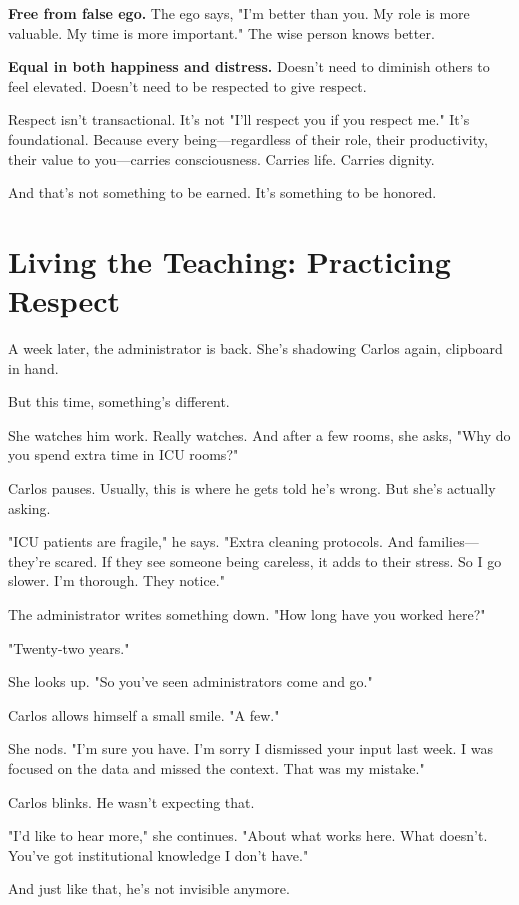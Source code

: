 \documentclass[11pt,twoside]{book}
\begin{document}
\textbf{\textbf{Free from false ego.}} The ego says, "I'm better than you. My role is more valuable. My time is more important." The wise person knows better.

\textbf{\textbf{Equal in both happiness and distress.}} Doesn't need to diminish others to feel elevated. Doesn't need to be respected to give respect.

Respect isn't transactional. It's not "I'll respect you if you respect me." It's foundational. Because every being—regardless of their role, their productivity, their value to you—carries consciousness. Carries life. Carries dignity.

And that's not something to be earned. It's something to be honored.

\section*{Living the Teaching: Practicing Respect}

A week later, the administrator is back. She's shadowing Carlos again, clipboard in hand.

But this time, something's different.

She watches him work. Really watches. And after a few rooms, she asks, "Why do you spend extra time in ICU rooms?"

Carlos pauses. Usually, this is where he gets told he's wrong. But she's actually asking.

"ICU patients are fragile," he says. "Extra cleaning protocols. And families—they're scared. If they see someone being careless, it adds to their stress. So I go slower. I'm thorough. They notice."

The administrator writes something down. "How long have you worked here?"

"Twenty-two years."

She looks up. "So you've seen administrators come and go."

Carlos allows himself a small smile. "A few."

She nods. "I'm sure you have. I'm sorry I dismissed your input last week. I was focused on the data and missed the context. That was my mistake."

Carlos blinks. He wasn't expecting that.

"I'd like to hear more," she continues. "About what works here. What doesn't. You've got institutional knowledge I don't have."

And just like that, he's not invisible anymore.
\end{document}
